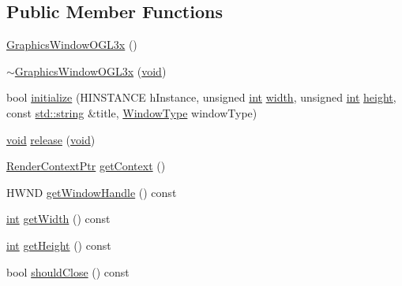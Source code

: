 \subsection*{Public Member Functions}
\begin{DoxyCompactItemize}
\item 
\hyperlink{class_a_c_t_k_1_1_graphics_window_o_g_l3x_a4e0b99530b9a2eb8a8239f6c0fe6c147}{Graphics\-Window\-O\-G\-L3x} ()
\item 
\hyperlink{class_a_c_t_k_1_1_graphics_window_o_g_l3x_a5ff4b07ae8ade260412de723f65c675e}{$\sim$\-Graphics\-Window\-O\-G\-L3x} (\hyperlink{wglew_8h_aeea6e3dfae3acf232096f57d2d57f084}{void})
\item 
bool \hyperlink{class_a_c_t_k_1_1_graphics_window_o_g_l3x_aa1d3331e68032ade2e21233b3fcb3ac7}{initialize} (H\-I\-N\-S\-T\-A\-N\-C\-E h\-Instance, unsigned \hyperlink{wglew_8h_a500a82aecba06f4550f6849b8099ca21}{int} \hyperlink{glew_8h_aa105b18f96e6bc2485cb7f576a7fb9ba}{width}, unsigned \hyperlink{wglew_8h_a500a82aecba06f4550f6849b8099ca21}{int} \hyperlink{glew_8h_aa214bd63e12f7ddf524c83894fcc69a7}{height}, const \hyperlink{glew_8h_ae9ea2d206f76ea82db7a2ea002fdef2f}{std\-::string} \&title, \hyperlink{namespace_a_c_t_k_a5cb71db6f350f73a1acaf41781bffb5b}{Window\-Type} window\-Type)
\item 
\hyperlink{wglew_8h_aeea6e3dfae3acf232096f57d2d57f084}{void} \hyperlink{class_a_c_t_k_1_1_graphics_window_o_g_l3x_a34a34445982ae848f05e5f7bcd028be2}{release} (\hyperlink{wglew_8h_aeea6e3dfae3acf232096f57d2d57f084}{void})
\item 
\hyperlink{namespace_a_c_t_k_a7030f603b6015e2f7c08ab1cc584d084}{Render\-Context\-Ptr} \hyperlink{class_a_c_t_k_1_1_graphics_window_o_g_l3x_a7f0cd1e7b31e9605f2b63c95d12393a2}{get\-Context} ()
\item 
H\-W\-N\-D \hyperlink{class_a_c_t_k_1_1_graphics_window_o_g_l3x_a21d11e5d9aac7909dd41769a5c138952}{get\-Window\-Handle} () const 
\item 
\hyperlink{wglew_8h_a500a82aecba06f4550f6849b8099ca21}{int} \hyperlink{class_a_c_t_k_1_1_graphics_window_o_g_l3x_a2d941ad6177859781e9c07ed3a1f6f30}{get\-Width} () const 
\item 
\hyperlink{wglew_8h_a500a82aecba06f4550f6849b8099ca21}{int} \hyperlink{class_a_c_t_k_1_1_graphics_window_o_g_l3x_a592d5701fde28c02dac903d0d7590003}{get\-Height} () const 
\item 
bool \hyperlink{class_a_c_t_k_1_1_graphics_window_o_g_l3x_a97ec29b50cfb23bb448bcf313f0675f5}{should\-Close} () const 
\end{DoxyCompactItemize}


